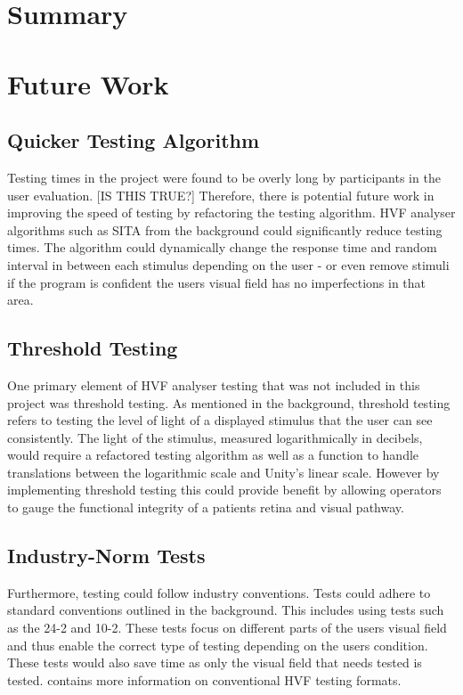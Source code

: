 \documentclass{l4proj}
\begin{document}
\section{Summary}
\section{Future Work}
\subsection{Quicker Testing Algorithm}
Testing times in the project were found to be overly long by participants in the user evaluation. [IS THIS TRUE?] Therefore, there is potential future work in improving the speed of testing by refactoring the testing algorithm. HVF analyser algorithms such as SITA from the background could significantly reduce testing times. The algorithm could dynamically change the response time and random interval in between each stimulus depending on the user - or even remove stimuli if the program is confident the users visual field has no imperfections in that area.

\subsection{Threshold Testing}
One primary element of HVF analyser testing that was not included in this project was threshold testing. As mentioned in the background, threshold testing refers to testing the level of light of a displayed stimulus that the user can see consistently. The light of the stimulus, measured logarithmically in decibels, would require a refactored testing algorithm as well as a function to handle translations between the logarithmic scale and Unity's linear scale. However by implementing threshold testing this could provide benefit by allowing operators to gauge the functional integrity of a patients retina and visual pathway.

\subsection{Industry-Norm Tests}
Furthermore, testing could follow industry conventions. Tests could adhere to standard conventions outlined in the background. This includes using tests such as the 24-2 and 10-2. These tests focus on different parts of the users visual field and thus enable the correct type of testing depending on the users condition. These tests would also save time as only the visual field that needs tested is tested. \citet{RuiaTripathy2021HVF} contains more information on conventional HVF testing formats.
\end{document}
